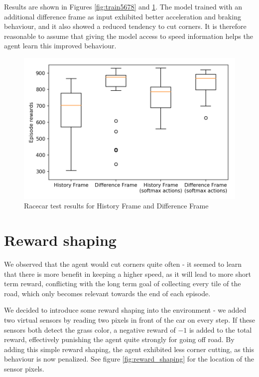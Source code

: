 \documentclass[a4paper, 11pt, conference]{ieeeconf}      %
\begin{document}
Results are shown in Figures \ref{fig:train5678} and \ref{fig:test3}. The model trained with an additional difference frame as input exhibited better acceleration and braking behaviour, and it also showed a reduced tendency to cut corners. It is therefore reasonable to assume that giving the model access to speed information helps the agent learn this improved behaviour.

\begin{figure}
  \includegraphics[width=\linewidth]{figs/racecar_3.png}
  \caption{Racecar test results for History Frame and Difference Frame}
  \label{fig:test3}
\end{figure}

\section{Reward shaping}

We observed that the agent would cut corners quite often - it seemed to learn that there is more benefit in keeping a higher speed, as it will lead to more short term reward, conflicting with the long term goal of collecting every tile of the road, which only becomes relevant towards the end of each episode.

We decided to introduce some reward shaping into the environment - we added two virtual sensors by reading two pixels in front of the car on every step. If these sensors both detect the grass color, a negative reward of $-1$ is added to the total reward, effectively punishing the agent quite strongly for going off road. By adding this simple reward shaping, the agent exhibited less corner cutting, as this behaviour is now penalized. See figure \ref{fig:reward_shaping} for the location of the sensor pixels.
\end{document}
